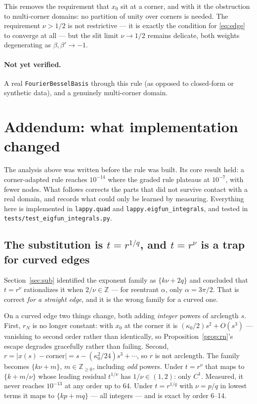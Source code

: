 \documentclass[11pt]{article}
\theoremstyle{remark}
\begin{document}
This removes the requirement that $x_0$ sit at a corner, and with it the
obstruction to multi-corner domains: no partition of unity over corners is
needed. The requirement $\nu>1/2$ is not restrictive --- it is exactly the
condition for \eqref{eq:edge} to converge at all --- but the slit limit
$\nu\to1/2$ remains delicate, both weights degenerating as $\beta,\beta'\to-1$.

\paragraph{Not yet verified.} A real \texttt{FourierBesselBasis} through this
rule (as opposed to closed-form or synthetic data), and a genuinely multi-corner
domain.


\section{Addendum: what implementation changed}\label{sec:addendum}

The analysis above was written before the rule was built. Its core result held:
a corner-adapted rule reaches $10^{-14}$ where the graded rule plateaus at
$10^{-7}$, with fewer nodes. What follows corrects the parts that did not survive
contact with a real domain, and records what could only be learned by measuring.
Everything here is implemented in \verb|lappy.quad| and
\verb|lappy.eigfun_integrals|, and tested in \verb|tests/test_eigfun_integrals.py|.

\subsection{The substitution is $t=r^{1/q}$, and $t=r^{\nu}$ is a trap for curved edges}

Section~\ref{sec:sub} identified the exponent family as $\{k\nu+2q\}$ and
concluded that $t=r^{\nu}$ rationalizes it when $2/\nu\in\mathbb{Z}$ --- for
reentrant $\alpha$, only $\alpha=3\pi/2$. That is correct \emph{for a straight
edge}, and it is the wrong family for a curved one.

On a curved edge two things change, both adding \emph{integer} powers of
arclength $s$. First, $r_N$ is no longer constant: with $x_0$ at the corner it is
$(\kappa_0/2)s^2+O(s^3)$ --- vanishing to second order rather than identically,
so Proposition~\ref{prop:rn}'s escape degrades gracefully rather than failing.
Second, $r=|x(s)-\text{corner}|=s-(\kappa_0^2/24)s^3+\cdots$, so $r$ is not
arclength. The family becomes $\{k\nu+m\}$, $m\in\mathbb{Z}_{\ge0}$, including
\emph{odd} powers. Under $t=r^{\nu}$ that maps to $\{k+m/\nu\}$ whose leading
residual $t^{1/\nu}$ has $1/\nu\in(1,2)$: only $C^1$. Measured, it never reaches
$10^{-13}$ at any order up to 64. Under $t=r^{1/q}$ with $\nu=p/q$ in lowest
terms it maps to $\{kp+mq\}$ --- all integers --- and is exact by order 6--14.
\end{document}

